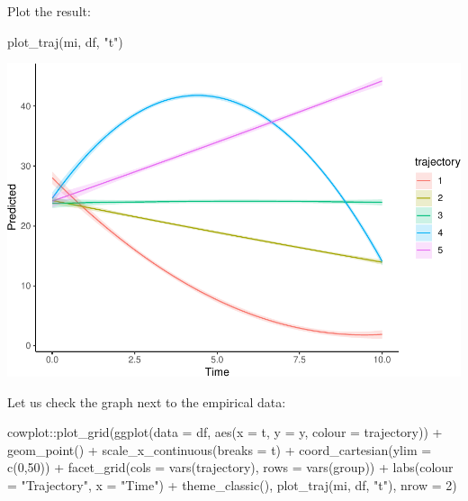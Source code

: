 \documentclass[
]{book}
\newenvironment{Shaded}{\begin{snugshade}}{\end{snugshade}}
\newcommand{\AttributeTok}[1]{\textcolor[rgb]{0.77,0.63,0.00}{#1}}
\newcommand{\DecValTok}[1]{\textcolor[rgb]{0.00,0.00,0.81}{#1}}
\newcommand{\FunctionTok}[1]{\textcolor[rgb]{0.00,0.00,0.00}{#1}}
\newcommand{\NormalTok}[1]{#1}
\newcommand{\SpecialCharTok}[1]{\textcolor[rgb]{0.00,0.00,0.00}{#1}}
\newcommand{\StringTok}[1]{\textcolor[rgb]{0.31,0.60,0.02}{#1}}
\begin{document}
Plot the result:

\begin{Shaded}
\begin{Highlighting}[]
\FunctionTok{plot\_traj}\NormalTok{(mi, df, }\StringTok{"t"}\NormalTok{)}
\end{Highlighting}
\end{Shaded}

\includegraphics{DZP_R_bookdown_files/figure-latex/unnamed-chunk-36-1.pdf}

Let us check the graph next to the empirical data:

\begin{Shaded}
\begin{Highlighting}[]
\NormalTok{cowplot}\SpecialCharTok{::}\FunctionTok{plot\_grid}\NormalTok{(}\FunctionTok{ggplot}\NormalTok{(}\AttributeTok{data =}\NormalTok{ df, }\FunctionTok{aes}\NormalTok{(}\AttributeTok{x =}\NormalTok{ t, }\AttributeTok{y =}\NormalTok{ y, }\AttributeTok{colour =}\NormalTok{ trajectory)) }\SpecialCharTok{+}
                     \FunctionTok{geom\_point}\NormalTok{() }\SpecialCharTok{+}
                     \FunctionTok{scale\_x\_continuous}\NormalTok{(}\AttributeTok{breaks =}\NormalTok{ t) }\SpecialCharTok{+}
                     \FunctionTok{coord\_cartesian}\NormalTok{(}\AttributeTok{ylim =} \FunctionTok{c}\NormalTok{(}\DecValTok{0}\NormalTok{,}\DecValTok{50}\NormalTok{)) }\SpecialCharTok{+}
                     \FunctionTok{facet\_grid}\NormalTok{(}\AttributeTok{cols =} \FunctionTok{vars}\NormalTok{(trajectory), }\AttributeTok{rows =} \FunctionTok{vars}\NormalTok{(group)) }\SpecialCharTok{+}
                     \FunctionTok{labs}\NormalTok{(}\AttributeTok{colour =} \StringTok{"Trajectory"}\NormalTok{, }\AttributeTok{x =} \StringTok{"Time"}\NormalTok{) }\SpecialCharTok{+}
                     \FunctionTok{theme\_classic}\NormalTok{(),}
                   \FunctionTok{plot\_traj}\NormalTok{(mi, df, }\StringTok{"t"}\NormalTok{), }\AttributeTok{nrow =} \DecValTok{2}\NormalTok{)}
\end{Highlighting}
\end{Shaded}
\end{document}
